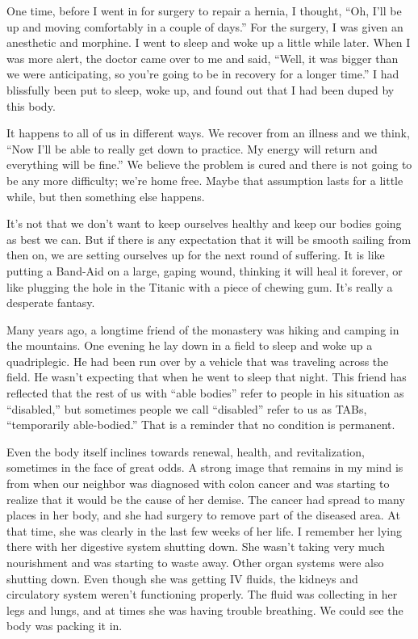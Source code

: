 One time, before I went in for surgery to repair a hernia, I thought, ``Oh, I'll be up and moving comfortably in a couple of days.'' For the surgery, I was given an anesthetic and morphine. I went to sleep and woke up a little while later. When I was more alert, the doctor came over to me and said, ``Well, it was bigger than we were anticipating, so you're going to be in recovery for a longer time.'' I had blissfully been put to sleep, woke up, and found out that I had been duped by this body.

It happens to all of us in different ways. We recover from an illness and we think, ``Now I'll be able to really get down to practice. My energy will return and everything will be fine.'' We believe the problem is cured and there is not going to be any more difficulty; we're home free. Maybe that assumption lasts for a little while, but then something else happens.

It's not that we don't want to keep ourselves healthy and keep our bodies going as best we can. But if there is any expectation that it will be smooth sailing from then on, we are setting ourselves up for the next round of suffering. It is like putting a Band-Aid on a large, gaping wound, thinking it will heal it forever, or like plugging the hole in the Titanic with a piece of chewing gum. It's really a desperate fantasy.

Many years ago, a longtime friend of the monastery was hiking and camping in the mountains. One evening he lay down in a field to sleep and woke up a quadriplegic. He had been run over by a vehicle that was traveling across the field. He wasn't expecting that when he went to sleep that night. This friend has reflected that the rest of us with ``able bodies'' refer to people in his situation as ``disabled,'' but sometimes people we call ``disabled'' refer to us as TABs, ``temporarily able-bodied.'' That is a reminder that no condition is permanent.

Even the body itself inclines towards renewal, health, and revitalization, sometimes in the face of great odds. A strong image that remains in my mind is from when our neighbor was diagnosed with colon cancer and was starting to realize that it would be the cause of her demise. The cancer had spread to many places in her body, and she had surgery to remove part of the diseased area. At that time, she was clearly in the last few weeks of her life. I remember her lying there with her digestive system shutting down. She wasn't taking very much nourishment and was starting to waste away. Other organ systems were also shutting down. Even though she was getting IV fluids, the kidneys and circulatory system weren't functioning properly. The fluid was collecting in her legs and lungs, and at times she was having trouble breathing. We could see the body was packing it in.

